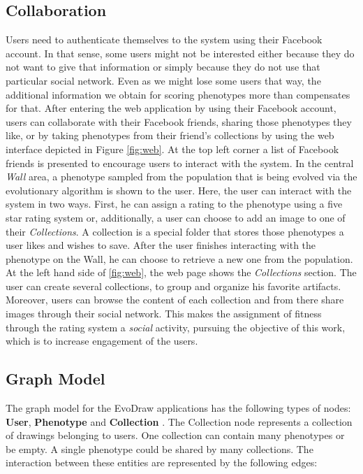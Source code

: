 \subsection{Collaboration}
\label{sec:col}
Users need to authenticate themselves to the system using their
Facebook account. In that sense, some users might not be interested
either because they do not want to give that information or simply because
they do not use that particular social network. Even as we might lose
some users that way, the additional information we obtain for scoring
phenotypes more than compensates for that. 
After entering the web application by using their Facebook account,
users can collaborate with their Facebook friends, 
sharing those phenotypes they like, or by taking phenotypes
from their friend's collections by using the web interface depicted 
in Figure \ref{fig:web}.
At the top left corner a list of Facebook friends is presented
to encourage users to interact with the system. In the central 
\emph{ Wall } area, a phenotype sampled from the population that is
being evolved via the evolutionary algorithm 
is shown to the user.
Here, the user can interact with the system in two ways.
First, he can assign a rating to the phenotype using
a five star rating system or,
additionally, a user can choose to add an image to one of their \emph{Collections}.
A collection is a special folder that stores those phenotypes a user likes and wishes
to save. After the user finishes interacting with the phenotype
on the Wall, he can choose to retrieve a new one from the population.
At the left hand side of \ref{fig:web}, the web page shows the \emph{Collections} section.
The user can create several collections, to group and organize his favorite 
artifacts. Moreover, users can browse the content of each collection and from
there share images through their social network. This makes the assignment 
of fitness through the rating system a {\em social} activity, 
pursuing the objective of this work, which is to increase engagement of the users.


\subsection{Graph Model} 
The graph model for the EvoDraw applications has the following types of
nodes: {\bf User}, {\bf Phenotype} and {\bf Collection} . The Collection node represents
a collection of drawings belonging to users. One collection can contain many phenotypes 
or be empty. A single phenotype could be shared by many collections. The interaction 
between these entities are represented by the following edges:


